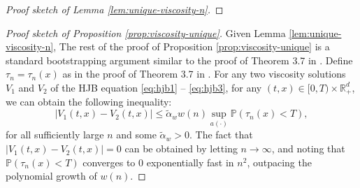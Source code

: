 \documentclass[11pt]{article}
\theoremstyle{definition}
\theoremstyle{plain}
\newcommand{\R}{\mathbb{R}}
\newcommand{\pr}{\mathbb{P}}
\begin{document}
\begin{appendices}
\begin{proof}[Proof sketch of Lemma \ref{lem:unique-viscosity-n}]
\end{proof}
\begin{proof}[Proof sketch of Proposition \ref{prop:viscosity-unique}]
Given Lemma \ref{lem:unique-viscosity-n}, 
The rest of the proof of Proposition \ref{prop:viscosity-unique} is a standard bootstrapping argument similar to the proof of Theorem 3.7 in \cite{borkar2004ergodic}. 
Define $\tau_n = \tau_n(x)$ as in the proof of Theorem 3.7 in \cite{borkar2004ergodic}. 
For any two viscosity solutions $V_1$ and $V_2$ of the HJB equation \eqref{eq:hjb1} -- \eqref{eq:hjb3}, for any $(t,x) \in [0,T)\times \R_+^d$,
we can obtain the following inequality: 
\[
|V_1(t,x) - V_2(t,x)| \le \tilde \alpha_w w(n) \sup_{a(\cdot)} \pr\left(\tau_n(x) < T\right), 
\]
for all sufficiently large $n$ and some $\tilde \alpha_w > 0$. The fact that $|V_1(t,x) - V_2(t,x)| = 0$ can be obtained by letting $n \to \infty$, 
and noting that $\pr\left(\tau_n(x) < T\right)$ converges to $0$ exponentially fast in $n^2$, outpacing the polynomial growth of $w(n)$. 
\end{proof}


\end{appendices}
\end{document}
